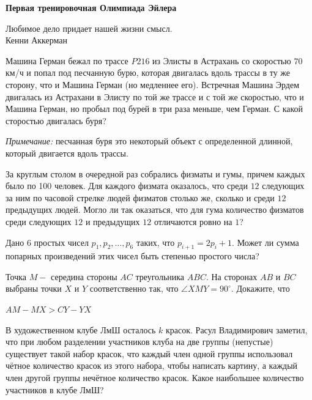 \hspace{3mm}

\centerline{\bf \Huge Первая тренировочная Олимпиада Эйлера}

\hspace{3mm}

 \begin{flushright}
     \scriptsize{Любимое дело придает нашей жизни смысл.\\Кенни Аккерман}
 \end{flushright}
 
 Машина Герман бежал по трассе $P216$ из Элисты в Астрахань со скоростью $70$ км/ч и попал под песчанную бурю, которая двигалась вдоль трассы в ту же сторону, что и Машина Герман (но медленнее его). Встречная Машина Эрдем двигалась из Астрахани в Элисту по той же трассе и с той же скоростью, что и Машина Герман, но пробыл под бурей в три раза меньше, чем Герман. С какой сторостью двигалась буря?

\textit{Примечание:} песчанная буря это некоторый объект с определенной длинной, который двигается вдоль трассы.

\hspace{3mm}

За круглым столом в очередной раз собрались физматы и гумы, причем каждых было по 100 человек. Для каждого физмата оказалось, что среди $12$ следующих за ним по часовой стрелке людей физматов столько же, сколько и среди $12$ предыдущих людей. Могло ли так оказаться, что для гума количество физматов среди следующих $12$ и предыдущих $12$ отличаются ровно на $1$?

\hspace{3mm}

Дано $6$ простых чисел $p_1, p_2, \dotsc, p_6$ таких, что $p_{i+1} = 2p_i + 1$. Может ли сумма попарных произведений этих чисел быть степенью простого числа?

\hspace{3mm}

 Точка $M -$ середина стороны $AC$ треугольника $ABC.$ На сторонах $AB$ и $BC$ выбраны точки $X$ и $Y$ соответственно так, что $\angle XMY = 90^{\circ}$. Докажите, что \\

\centerline{$AM -MX > CY - YX$}

\hspace{3mm}

В художественном клубе ЛмШ осталось $k$ красок. Расул Владимирович заметил, что при любом разделении участников клуба на две группы (непустые) существует такой набор красок, что каждый член одной группы использовал чётное количество красок из этого набора, чтобы написать картину, а каждый член другой группы нечётное количество красок. Какое наибольшее количество участников в клубе ЛмШ?